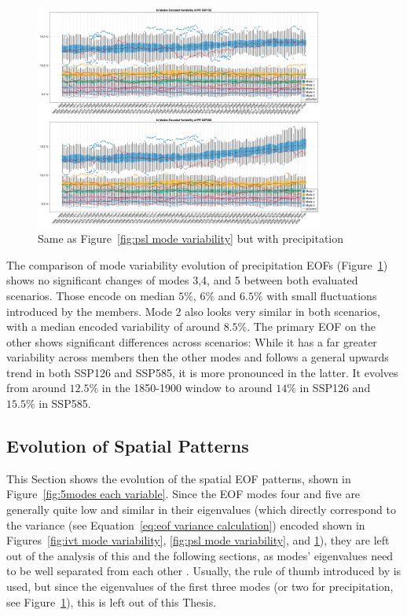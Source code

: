 \begin{figure}[htb]
  \begin{center}
    \includegraphics[width=0.85\textwidth]{figures/mode_variability_pr_50seasons.png}
  \end{center}
  \caption{Same as Figure~\ref{fig:psl mode variability} but with precipitation}\label{fig:pr mode variability}
\end{figure}

The comparison of mode variability evolution of precipitation EOFs (Figure~\ref{fig:pr mode variability}) shows no significant changes of modes 3,4, and 5 between both evaluated scenarios. 
Those encode on median $5\%$, $6\%$ and $6.5\%$ with small fluctuations introduced by the members. 
Mode 2 also looks very similar in both scenarios, with a median encoded variability of around $8.5\%$. 
The primary EOF on the other shows significant differences across scenarios: While it has a far greater variability across members then the other modes and follows a general upwards trend in both SSP126 and SSP585, it is more pronounced in the latter. 
It evolves from around $12.5\%$ in the 1850-1900 window to around $14\%$ in SSP126 and $15.5\%$ in SSP585.  


\subsection{Evolution of Spatial Patterns}

This Section shows the evolution of the spatial EOF patterns, shown in Figure~\ref{fig:5modes each variable}. 
Since the EOF modes four and five are generally quite low and similar in their eigenvalues (which directly correspond to the variance (see Equation~\ref{eq:eof variance calculation}) encoded shown in Figures~\ref{fig:ivt mode variability}, \ref{fig:psl mode variability}, and \ref{fig:pr mode variability}), they are left out of the analysis of this and the following sections, as modes' eigenvalues need to be well separated from each other \cite{hannachi_empirical_2007}. 
Usually, the rule of thumb introduced by  is used, but since the eigenvalues of the first three modes (or two for precipitation, see Figure~\ref{fig:pr mode variability}), this is left out of this Thesis. 

